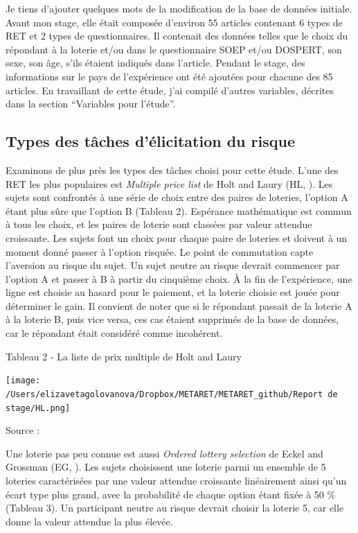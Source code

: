 \documentclass[12pt]{article}
\begin{document}
Je tiens d'ajouter quelques mots de la modification de la base de
données initiale. Avant mon stage, elle était composée d'environ 55
articles contenant 6 types de RET et 2 types de questionnaires. Il
contenait des données telles que le choix du répondant à la loterie
et/ou dans le questionnaire SOEP et/ou DOSPERT, son sexe, son âge, s'ils
étaient indiqués dans l'article. Pendant le stage, des informations sur
le pays de l'expérience ont été ajoutées pour chacune des 85 articles.
En travaillant de cette étude, j'ai compilé d'autres variables, décrites
dans la section ``Variables pour l'étude''.

\subsection{Types des tâches d'élicitation du risque}

Examinons de plus près les types des tâches choisi pour cette étude.
L'une des RET les plus populaires est \emph{Multiple price list} de Holt
and Laury (HL, \citet{Holt2002}). Les sujets sont confrontés à une série
de choix entre des paires de loteries, l'option A étant plus sûre que
l'option B (Tableau 2). Espérance mathématique est commun à tous les
choix, et les paires de loterie sont classées par valeur attendue
croissante. Les sujets font un choix pour chaque paire de loteries et
doivent à un moment donné passer à l'option risquée. Le point de
commutation capte l'aversion au risque du sujet. Un sujet neutre au
risque devrait commencer par l'option A et passer à B à partir du
cinquième choix. À la fin de l'expérience, une ligne est choisie au
hasard pour le paiement, et la loterie choisie est jouée pour déterminer
le gain. Il convient de noter que si le répondant passait de la loterie
A à la loterie B, puis vice versa, ces cas étaient supprimés de la base
de données, car le répondant était considéré comme incohérent.

Tableau 2 - La liste de prix multiple de Holt and Laury

\hfil \texttt{[image: /Users/elizavetagolovanova/Dropbox/METARET/METARET\_github/Report de stage/HL.png]}
\hfil

Source : \citet{Holt2002}

Une loterie pas peu connue est aussi \emph{Ordered lottery selection} de
Eckel and Grossman (EG, \citet{Eckel2002}). Les sujets choisissent une
loterie parmi un ensemble de 5 loteries caractérisées par une valeur
attendue croissante linéairement ainsi qu'un écart type plus grand, avec
la probabilité de chaque option étant fixée à 50 \% (Tableau 3). Un
participant neutre au risque devrait choisir la loterie 5, car elle
donne la valeur attendue la plus élevée.
\end{document}
